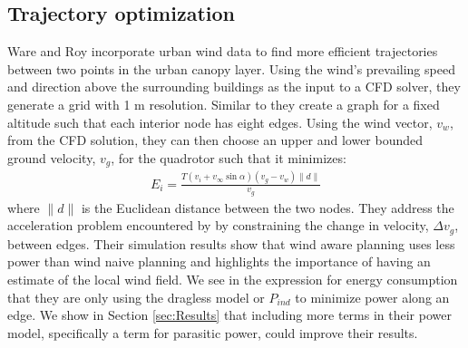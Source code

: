 \subsection{Trajectory optimization}
Ware and Roy \cite{ware2016analysis} incorporate urban wind data to find more efficient trajectories between two points in the urban canopy layer. Using the wind's prevailing speed and direction above the surrounding buildings as the input to a CFD solver, they generate a grid with 1 m resolution. Similar to \cite{di2015energy} they create a graph for a fixed altitude such that each interior node has eight edges. Using the wind vector, $v_w$, from the CFD solution, they can then choose an upper and lower bounded ground velocity, $v_g$, for the quadrotor such that it minimizes:
\begin{align*}
E_i = \frac{T(v_i + v_\infty \sin{\alpha}) (v_g - v_w) \|d\|}{v_g}
\end{align*}
where $\|d\|$ is the Euclidean distance between the two nodes. They address the acceleration problem encountered by \cite{di2015energy} by constraining the change in velocity, $\Delta v_g$, between edges. Their simulation results show that wind aware planning uses less power than wind naive planning and highlights the importance of having an estimate of the local wind field. We see in the expression for energy consumption that they are only using the dragless model or $P_{ind}$ to minimize power along an edge. We show in Section \ref{sec:Results} that including more terms in their power model, specifically a term for parasitic power, could improve their results.






